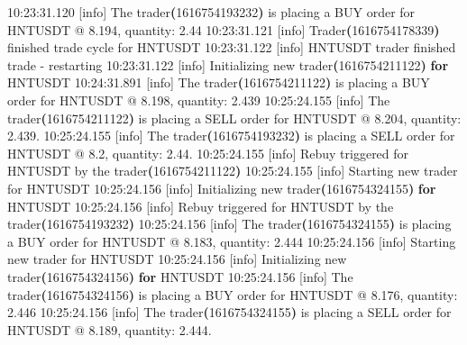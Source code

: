 \documentclass[
  oneside]{book}
\newenvironment{Shaded}{\begin{snugshade}}{\end{snugshade}}
\newcommand{\AttributeTok}[1]{\textcolor[rgb]{0.77,0.63,0.00}{#1}}
\newcommand{\ControlFlowTok}[1]{\textcolor[rgb]{0.13,0.29,0.53}{\textbf{#1}}}
\newcommand{\ErrorTok}[1]{\textcolor[rgb]{0.64,0.00,0.00}{\textbf{#1}}}
\newcommand{\ExtensionTok}[1]{#1}
\newcommand{\KeywordTok}[1]{\textcolor[rgb]{0.13,0.29,0.53}{\textbf{#1}}}
\newcommand{\NormalTok}[1]{#1}
\begin{document}
\begin{Shaded}
\begin{Highlighting}[]
\ExtensionTok{10:23:31.120}\NormalTok{ [info]  The trader}\ErrorTok{(}\ExtensionTok{1616754193232}\KeywordTok{)} \ExtensionTok{is}\NormalTok{ placing a BUY order for HNTUSDT @ 8.194, quantity: 2.44}
\ExtensionTok{10:23:31.121}\NormalTok{ [info]  Trader}\ErrorTok{(}\ExtensionTok{1616754178339}\KeywordTok{)} \ExtensionTok{finished}\NormalTok{ trade cycle for HNTUSDT}
\ExtensionTok{10:23:31.122}\NormalTok{ [info]  HNTUSDT trader finished trade }\AttributeTok{{-}}\NormalTok{ restarting}
\ExtensionTok{10:23:31.122}\NormalTok{ [info]  Initializing new trader}\ErrorTok{(}\ExtensionTok{1616754211122}\KeywordTok{)} \ControlFlowTok{for}\NormalTok{ HNTUSDT}
\ExtensionTok{10:24:31.891}\NormalTok{ [info]  The trader}\ErrorTok{(}\ExtensionTok{1616754211122}\KeywordTok{)} \ExtensionTok{is}\NormalTok{ placing a BUY order for HNTUSDT @ 8.198, quantity: 2.439}
\ExtensionTok{10:25:24.155}\NormalTok{ [info]  The trader}\ErrorTok{(}\ExtensionTok{1616754211122}\KeywordTok{)} \ExtensionTok{is}\NormalTok{ placing a SELL order for HNTUSDT @ 8.204, quantity: 2.439.}
\ExtensionTok{10:25:24.155}\NormalTok{ [info]  The trader}\ErrorTok{(}\ExtensionTok{1616754193232}\KeywordTok{)} \ExtensionTok{is}\NormalTok{ placing a SELL order for HNTUSDT @ 8.2, quantity: 2.44.}
\ExtensionTok{10:25:24.155}\NormalTok{ [info]  Rebuy triggered for HNTUSDT by the trader}\ErrorTok{(}\ExtensionTok{1616754211122}\KeywordTok{)}
\ExtensionTok{10:25:24.155}\NormalTok{ [info]  Starting new trader for HNTUSDT}
\ExtensionTok{10:25:24.156}\NormalTok{ [info]  Initializing new trader}\ErrorTok{(}\ExtensionTok{1616754324155}\KeywordTok{)} \ControlFlowTok{for}\NormalTok{ HNTUSDT}
\ExtensionTok{10:25:24.156}\NormalTok{ [info]  Rebuy triggered for HNTUSDT by the trader}\ErrorTok{(}\ExtensionTok{1616754193232}\KeywordTok{)}
\ExtensionTok{10:25:24.156}\NormalTok{ [info]  The trader}\ErrorTok{(}\ExtensionTok{1616754324155}\KeywordTok{)} \ExtensionTok{is}\NormalTok{ placing a BUY order for HNTUSDT @ 8.183, quantity: 2.444}
\ExtensionTok{10:25:24.156}\NormalTok{ [info]  Starting new trader for HNTUSDT}
\ExtensionTok{10:25:24.156}\NormalTok{ [info]  Initializing new trader}\ErrorTok{(}\ExtensionTok{1616754324156}\KeywordTok{)} \ControlFlowTok{for}\NormalTok{ HNTUSDT }
\ExtensionTok{10:25:24.156}\NormalTok{ [info]  The trader}\ErrorTok{(}\ExtensionTok{1616754324156}\KeywordTok{)} \ExtensionTok{is}\NormalTok{ placing a BUY order for HNTUSDT @ 8.176, quantity: 2.446}
\ExtensionTok{10:25:24.156}\NormalTok{ [info]  The trader}\ErrorTok{(}\ExtensionTok{1616754324155}\KeywordTok{)} \ExtensionTok{is}\NormalTok{ placing a SELL order for HNTUSDT @ 8.189, quantity: 2.444.}

\end{Highlighting}
\end{Shaded}
\end{document}
